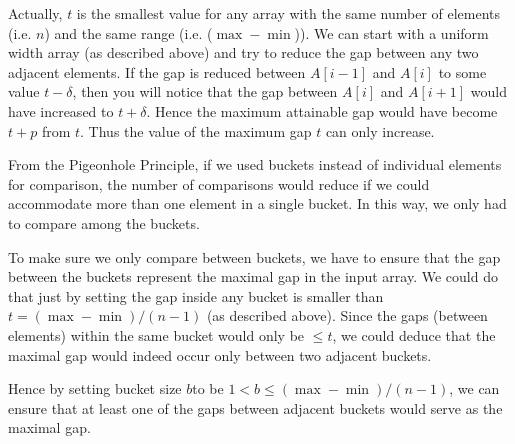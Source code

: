 Actually, $t$ is the smallest value for any array with the same number of elements (i.e. $n$) and the same range (i.e. ($\max−\min$)). We can start with a uniform width array (as described above) and try to reduce the gap between any two adjacent elements. If the gap is reduced between $A[i−1]$ and $A[i]$ to some value $t−\delta$, then you will notice that the gap between $A[i]$ and $A[i+1]$ would have increased to $t+\delta$. Hence the maximum attainable gap would have become $t+p$ from $t$. Thus the value of the maximum gap $t$ can only increase.

From the Pigeonhole Principle, if we used buckets instead of individual elements for comparison, the number of comparisons would reduce if we could accommodate more than one element in a single bucket. In this way, we only had to compare among the buckets. 

To make sure we only compare between buckets, we have to ensure that the gap between the buckets represent the maximal gap in the input array. We could do that just by setting the gap inside any bucket is smaller than $t=(\max−\min)/(n−1)$ (as described above). Since the gaps (between elements) within the same bucket would only be $\leq t$, we could deduce that the maximal gap would indeed occur only between two adjacent buckets.

Hence by setting bucket size $b$to be $1<b\leq(\max−\min)/(n−1)$, we can ensure that at least one of the gaps between adjacent buckets would serve as the maximal gap.


